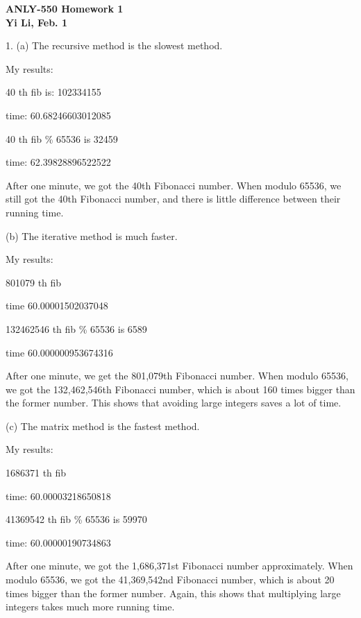 \documentclass[11pt]{article}
\begin{document}
\begin{center}
\large
\bf
ANLY-550 	Homework 1 \\[1pc]
\rm
\normalsize
Yi Li, Feb. 1 \\[1.5pc]  
\end{center}

\normalsize
1. (a) The recursive method is the slowest method. 

My results: 

40 th fib is: 102334155

time: 60.68246603012085

40 th fib \% 65536 is 32459

time: 62.39828896522522

After one minute, we got the 40th Fibonacci number. When modulo 65536, we still got the 40th Fibonacci number, and there is little difference between their running time.

(b) The iterative method is much faster. 

My results:

801079 th fib

time 60.00001502037048

132462546 th fib \% 65536 is 6589

time 60.000000953674316

After one minute, we get the 801,079th Fibonacci number. When modulo 65536, we got the 132,462,546th Fibonacci number, which is about 160 times bigger than the former number. This shows that avoiding large integers saves a lot of time.


(c) The matrix method is the fastest method. 

My results:

1686371 th fib

time: 60.00003218650818

41369542 th fib \% 65536 is 59970

time: 60.00000190734863

After one minute, we got the 1,686,371st Fibonacci number approximately. When modulo 65536, we got the 41,369,542nd Fibonacci number, which is about 20 times bigger than the former number. Again, this shows that multiplying large integers takes much more running time.
\end{document}
